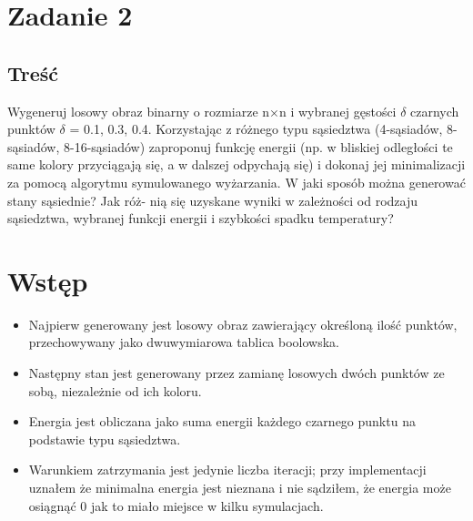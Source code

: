 \section{Zadanie 2}
\subsection{Treść} 
Wygeneruj losowy obraz binarny o rozmiarze n$\times$n i wybranej gęstości $\delta$ czarnych punktów
$\delta$ = 0.1, 0.3, 0.4. Korzystając z różnego typu sąsiedztwa (4-sąsiadów, 8-sąsiadów,
8-16-sąsiadów) zaproponuj funkcję energii (np. w bliskiej odległości te same kolory przyciągają
się, a w dalszej odpychają się) i dokonaj jej minimalizacji za pomocą algorytmu
symulowanego wyżarzania. W jaki sposób można generować stany sąsiednie? Jak róż-
nią się uzyskane wyniki w zależności od rodzaju sąsiedztwa, wybranej funkcji energii i
szybkości spadku temperatury?
\section{Wstęp}
\begin{itemize}
\item Najpierw generowany jest losowy obraz zawierający określoną ilość punktów, przechowywany jako dwuwymiarowa tablica boolowska.
\item Następny stan jest generowany przez zamianę losowych dwóch punktów ze sobą, niezależnie od ich koloru.
\item Energia jest obliczana jako suma energii każdego czarnego punktu na podstawie typu sąsiedztwa.
\item Warunkiem zatrzymania jest jedynie liczba iteracji; przy implementacji uznałem że minimalna energia jest nieznana i nie sądziłem, że energia może osiągnąć 0 jak to miało miejsce w kilku symulacjach.
\end{itemize}

